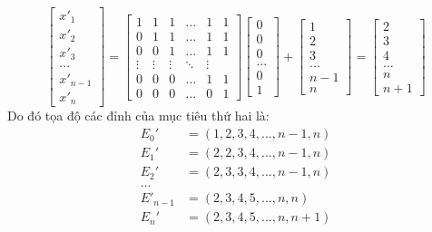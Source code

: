 \documentclass[12pt,a4paper]{article}
\begin{document}
\[
\begin{bmatrix}
    x'_1 \\ x'_2 \\ x'_3 \\ ... \\ x'_{n-1} \\ x'_n
\end{bmatrix} = \begin{bmatrix}
1 & 1 & 1 & \dots & 1 & 1 \\
0 & 1 & 1 & \dots & 1 & 1 \\
0 & 0 & 1 & \dots & 1 & 1 \\
\vdots & \vdots & \vdots & \ddots & \vdots \\
0 & 0 & 0 & \dots & 1 & 1 \\
0 & 0 & 0 & \dots & 0 & 1
\end{bmatrix} \begin{bmatrix}
    0 \\ 0 \\ 0 \\ \dots \\ 0 \\ 1
\end{bmatrix} + \begin{bmatrix}
    1 \\ 2 \\ 3 \\ ... \\ n-1 \\ n
\end{bmatrix} = \begin{bmatrix}
    2 \\ 3 \\ 4 \\ \dots \\ n \\ n+1
\end{bmatrix}
\]
Do đó tọa độ các đỉnh của mục tiêu thứ hai là: \[
\begin{aligned}
    E_0' &= (1,2,3,4,...,n-1,n) \\
    E_1' & = (2,2,3,4,...,n-1,n) \\
    E_2' & = (2,3,3,4,...,n-1,n) \\
    ... \\
    E'_{n-1} & = (2,3,4,5,...,n,n) \\
    E_n' & = (2,3,4,5,...,n,n+1)
\end{aligned}
\]
\end{document}
